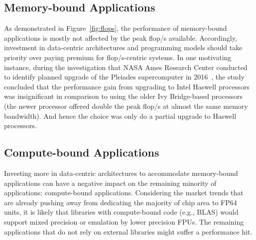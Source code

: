 \subsection{Memory-bound Applications}
As demonstrated in Figure~\ref{fig:flops}, the performance of memory-bound
applications is mostly not affected by the peak \unit[]{flop/s} available.
Accordingly, investment in data-centric architectures and programming models
should take priority over paying premium for \unit[]{flop/s}-centric systems.
In one motivating instance, during the investigation that NASA Ames Research
Center conducted to identify planned upgrade of the Pleiades supercomputer in
2016~\cite{saini_performance_2016}, the study concluded that the performance gain from upgrading to
Intel Haswell processors was insignificant in comparison to using the older
Ivy Bridge-based processors (the newer processor offered double the peak
\unit[]{flop/s} at almost the same memory bandwidth). And hence the choice was only do a partial upgrade to Haswell processors.

\subsection{Compute-bound Applications}
Investing more in data-centric architectures to accommodate memory-bound
applications can have a negative impact on the remaining minority of
applications: compute-bound applications. Considering the market trends that
are already pushing away from dedicating the majority of chip area to
FP64 units, it is likely that libraries with compute-bound code (e.g., BLAS)
would support mixed precision or emulation by lower precision FPUs. The
remaining applications that do not rely on external libraries might suffer a
performance hit.





